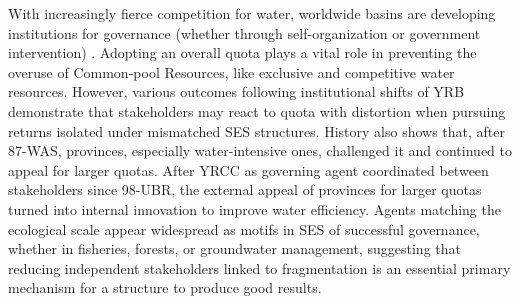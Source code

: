 With increasingly fierce competition for water, worldwide basins are developing institutions for governance (whether through self-organization or government intervention) \cite{andersson2020, wutich2009, cumming2020b}.
Adopting an overall quota plays a vital role in preventing the overuse of Common-pool Resources, like exclusive and competitive water resources.
However, various outcomes following institutional shifts of YRB demonstrate that stakeholders may react to quota with distortion when pursuing returns isolated under mismatched SES structures.
History also shows that, after 87-WAS, provinces, especially water-intensive ones, challenged it and continued to appeal for larger quotas.
After YRCC as governing agent coordinated between stakeholders since 98-UBR, the external appeal of provinces for larger quotas turned into internal innovation to improve water efficiency.
Agents matching the ecological scale appear widespread as motifs in SES of successful governance, whether in fisheries, forests, or groundwater management, suggesting that reducing independent stakeholders linked to fragmentation is an essential primary mechanism for a structure to produce good results.
